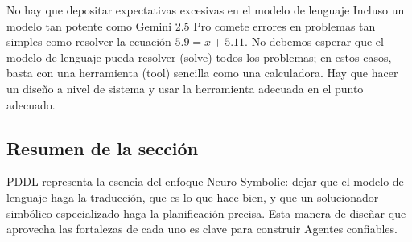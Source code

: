 \begin{warningbox}{No hay que depositar expectativas excesivas en el modelo de lenguaje}
Incluso un modelo tan potente como Gemini 2.5 Pro comete errores en problemas tan simples como resolver la ecuación $5.9 = x + 5.11$. No debemos esperar que el modelo de lenguaje pueda resolver (solve) todos los problemas; en estos casos, basta con una herramienta (tool) sencilla como una calculadora. Hay que hacer un diseño a nivel de sistema y usar la herramienta adecuada en el punto adecuado.
\end{warningbox}

\subsection{Resumen de la sección}

PDDL representa la esencia del enfoque Neuro-Symbolic: dejar que el modelo de lenguaje haga la traducción, que es lo que hace bien, y que un solucionador simbólico especializado haga la planificación precisa. Esta manera de diseñar que aprovecha las fortalezas de cada uno es clave para construir Agentes confiables.

